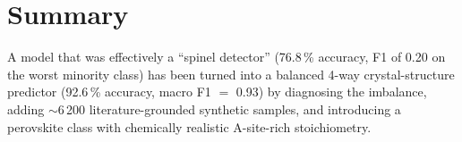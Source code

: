 \documentclass[11pt]{article}
\begin{document}
\section*{Summary}
A model that was effectively a ``spinel detector'' (76.8\,\% accuracy, F1 of
0.20 on the worst minority class) has been turned into a balanced 4-way
crystal-structure predictor (92.6\,\% accuracy, macro F1 $=$ 0.93) by
diagnosing the imbalance, adding $\sim$6\,200 literature-grounded synthetic
samples, and introducing a perovskite class with chemically realistic
A-site-rich stoichiometry.
\end{document}
